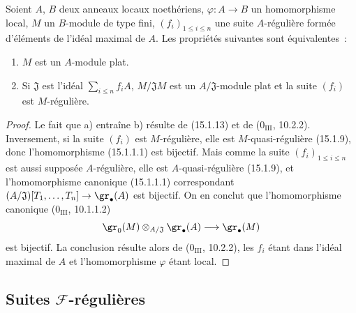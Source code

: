 \begin{proposition}[15.1.21]
\label{0.15.1.21-fr}
Soient $A$, $B$ deux anneaux locaux noethériens, $\varphi:A\to B$ un
homomorphisme local, $M$ un $B$-module de type fini, $(f_i)_{1\leq i\leq n}$
une suite $A$-régulière formée d'éléments de l'idéal maximal de $A$. Les
propriétés suivantes sont équivalentes~:
\begin{enumerate}
  \item[a)] $M$ est un $A$-module plat.
  \item[b)] Si $\mathfrak{J}$ est l'idéal $\sum_{i\leq n}f_iA$,
  $M/\mathfrak{J}M$ est un $A/\mathfrak{J}$-module plat et la suite $(f_i)$
  est $M$-régulière.
\end{enumerate}
\end{proposition}

\begin{proof}
Le fait que a) entraîne b) résulte de (15.1.13) et de
($0_{\mathrm{III}}$, 10.2.2). Inversement, si la suite $(f_i)$ est
$M$-régulière, elle est $M$-quasi-régulière (15.1.9), donc l'homomorphisme
(15.1.1.1) est bijectif. Mais comme la suite $(f_i)_{1\leq i\leq n}$ est aussi
supposée $A$-régulière, elle est $A$-quasi-régulière (15.1.9), et
l'homomorphisme canonique (15.1.1.1) correspondant
$(A/\mathfrak{J})[T_1,\ldots,T_n]\to\gr_\bullet(A)$ est bijectif. On en
conclut que l'homomorphisme canonique ($0_{\mathrm{III}}$, 10.1.1.2)
\[
  \gr_0(M)\otimes_{A/\mathfrak{J}}\gr_\bullet(A)
  \longrightarrow\gr_\bullet(M)
\]
est bijectif. La conclusion résulte alors de ($0_{\mathrm{III}}$, 10.2.2),
les $f_i$ étant dans l'idéal maximal de $A$ et l'homomorphisme $\varphi$ étant
local.
\end{proof}

\subsection{Suites \texorpdfstring{$\mathscr{F}$}{F}-régulières}
\label{subsection:0.15.2-fr}

